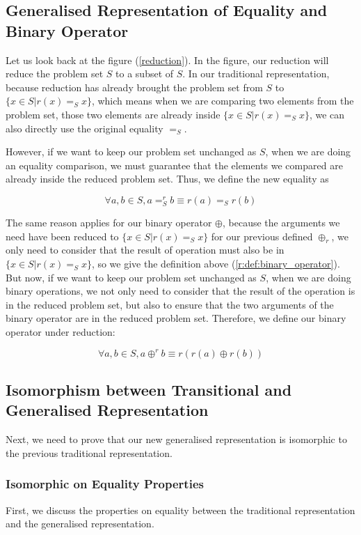 \documentclass[a4paper,12pt,twoside,openright]{report}
\newcommand{\e}[2]{
\begin{equation}
  \label{#1} 
  #2
\end{equation}
}
\begin{document}
\subsection{Generalised Representation of Equality and Binary Operator}
Let us look back at the figure (\ref{reduction}). In the figure, our reduction will reduce the problem set $S$ to a subset of $S$. In our traditional representation, because reduction has already brought the problem set from $S$ to $\{x \in S | r(x) =_S x\}$, which means when we are comparing two elements from the problem set, those two elements are already inside $\{x \in S | r(x) =_S x\}$, we can also directly use the original equality $=_S$.

However, if we want to keep our problem set unchanged as $S$, when we are doing an equality comparison, we must guarantee that the elements we compared are already inside the reduced problem set. Thus, we define the new equality as
\e{gr:def:eq}{\forall a,b \in S, a =^r_S b \equiv r(a) =_S r(b)}

The same reason applies for our binary operator  $\oplus$, because the arguments we need have been reduced to $\{x \in S | r(x) =_S x \}$ for our previous defined $\oplus_r$, we only need to consider that the result of operation must also be in $\{x \in S | r(x) =_S x\}$, so we give the definition above (\ref{r:def:binary_operator}).
But now, if we want to keep our problem set unchanged as $S$, when we are doing binary operations, we not only need to consider that the result of the operation is in the reduced problem set, but also to ensure that the two arguments of the binary operator are in the reduced problem set. Therefore, we define our binary operator under reduction:
\e{gr:def:binary_operator}{\forall a,b \in S, a \oplus^r b \equiv r(r(a) \oplus r(b))}

\subsection{Isomorphism between Transitional and Generalised Representation}
Next, we need to prove that our new generalised representation is isomorphic to the previous traditional representation.

\subsubsection{Isomorphic on Equality Properties}
First, we discuss the properties on equality between the traditional representation and the generalised representation.
\end{document}
